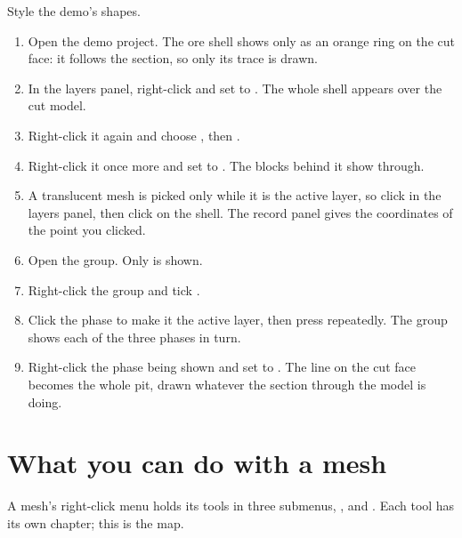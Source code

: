 \begin{tryit}
Style the demo's shapes.
\begin{enumerate}
\item Open the demo project. The ore shell shows only as an orange ring on the cut face: it follows the section, so only its trace is drawn.
\item In the layers panel, right-click  and set  to . The whole shell appears over the cut model.
\item Right-click it again and choose , then .
\item Right-click it once more and set  to . The blocks behind it show through.
\item A translucent mesh is picked only while it is the active layer, so click  in the layers panel, then click on the shell. The record panel gives the coordinates of the point you clicked.
\item Open the  group. Only  is shown.
\item Right-click the group and tick .
\item Click the phase to make it the active layer, then press \key{\}} repeatedly. The group shows each of the three phases in turn.
\item Right-click the phase being shown and set  to . The line on the cut face becomes the whole pit, drawn whatever the section through the model is doing.
\end{enumerate}
\end{tryit}

\section{What you can do with a mesh}\label{sec:meshes-tools}

A mesh's right-click menu holds its tools in three submenus, ,  and . Each tool has its own chapter; this is the map.

